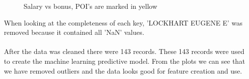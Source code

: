 \documentclass[12pt]{article}%
\begin{document}
\begin{figure}[!htbp]
  \centering
  \hfill
  \caption{Salary vs bonus, POI's are marked in yellow}
\end{figure}

When looking at the completeness of each key, 'LOCKHART EUGENE E' was removed because it contained all 'NaN' values.
\\
\\
After the data was cleaned there were 143 records. These 143 records were used to create the machine learning predictive model. From the plots we can see that we have removed outliers and the data looks good for feature creation and use.
\end{document}
